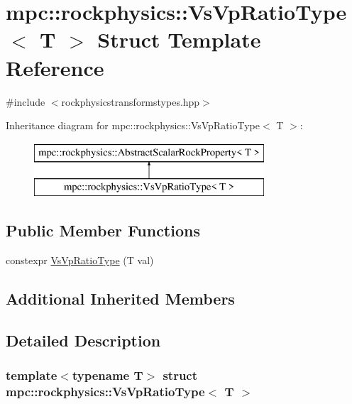 \hypertarget{structmpc_1_1rockphysics_1_1_vs_vp_ratio_type}{}\section{mpc\+:\+:rockphysics\+:\+:Vs\+Vp\+Ratio\+Type$<$ T $>$ Struct Template Reference}
\label{structmpc_1_1rockphysics_1_1_vs_vp_ratio_type}


{\ttfamily \#include $<$rockphysicstransformstypes.\+hpp$>$}

Inheritance diagram for mpc\+:\+:rockphysics\+:\+:Vs\+Vp\+Ratio\+Type$<$ T $>$\+:\begin{figure}[H]
\begin{center}
\leavevmode
\includegraphics[height=2.000000cm]{structmpc_1_1rockphysics_1_1_vs_vp_ratio_type}
\end{center}
\end{figure}
\subsection*{Public Member Functions}
\begin{DoxyCompactItemize}
\item 
constexpr \mbox{\hyperlink{structmpc_1_1rockphysics_1_1_vs_vp_ratio_type_a13eb55ba2f7ceb92a365e41be636b9bb}{Vs\+Vp\+Ratio\+Type}} (T val)
\end{DoxyCompactItemize}
\subsection*{Additional Inherited Members}


\subsection{Detailed Description}
\subsubsection*{template$<$typename T$>$\newline
struct mpc\+::rockphysics\+::\+Vs\+Vp\+Ratio\+Type$<$ T $>$}



